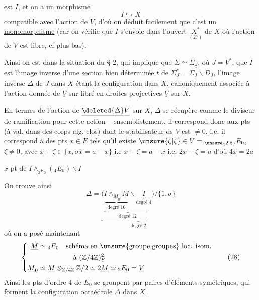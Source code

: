 est $I$, et on a un  \uline{morphisme}
\[
 I\hookrightarrow X \tag*{(26)}
\]
 compatible avec l'action de $\underline V$, d'où on déduit facilement que c'est un \uline{monomorphisme} (car on vérifie que $I$ s'envoie dans l'ouvert  $\underset{(27)}{X^*}$ de $X$ où l'action de $\underline V$ est libre, cf plus bas).

Ainsi on est dans la situation du § 2, qui implique que $\Sigma\simeq\Sigma_{\underline J}$, où $\underline J=\underline V^*$, que $I$ est l'image inverse d'une section bien déterminée $t$ de $\Sigma^*_{\underline J}=\Sigma_{\underline J}\smallsetminus D_{\underline J}$, l'image inverse $\Delta$ de $\underline J$ dans $X$ étant  la configuration  dans $X$, canoniquement associée à l'action donnée de $\underline V$ sur  fibré en droites projectives $\underline V$ sur $X$.

En termes de l'action de $\underline{\deleted{\Delta}V}$ sur $X$, $\underline\Delta$ se récupère comme le diviseur de ramification pour cette action -- ensemblistement, il correspond donc aux pts (à val. dans des corps alg. clos) dont le stabilisateur ds $V$ est $\ne 0$, i.e. il correspond à des pts $x\in E$ tels qu'il existe $\unsure{\zeta|\xi}\in V={}_{\unsure{2|8}}E_0$, $\zeta\ne0$, avec $x+\zeta\in\{x,\sigma x=a-x\}$ i.e $x+\zeta=a-x$ i.e. $2x+\zeta=a$ d'où $4x=2a$  

$x$ pt de $I\mathbin{\wedge}_{{}_2E_0}({}_4E_0)\smallsetminus I$

On trouve ainsi
\[
\Delta=\underbrace{\bigl(\underbrace{\underbrace{I\mathbin{\wedge}_{\underline M_0}\underline M}_{\text{degré }16}
\smallsetminus\underbrace{I}_{\text{degré }4}}_{\text{degré }12}\bigr)/\{1,\sigma\}}_{\text{degré }2}
\tag*{(27)}
\]
où on a posé maintenant
\[
\left\{\begin{aligned}
\underline M&\simeq {}_4E_0\quad\text{schéma en \unsure{groupe|groupes} loc. isom.}\\
&\hspace{5em}\text{à }(\mathbb Z/4\mathbb Z)^2_S\\
\underline M_0&\simeq\underline M\otimes_{\mathbb Z/4\mathbb Z}\mathbb Z/2
\simeq2\underline M\simeq{}_2E_0=\underline V
\end{aligned}\right.
\tag*{(28)}
\]
Ainsi  les pts d'ordre 4 de $E_0$ se groupent par  paires d'éléments symétriques, qui forment la configuration octaédrale $\Delta$ dans $X$.

